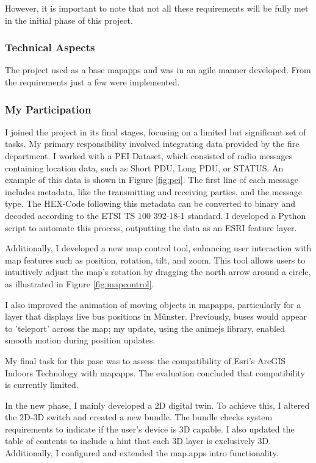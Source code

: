 \documentclass[11pt, titlepage, a4paper]{article}
\begin{document}
However, it is important to note that not all these requirements will be fully met in the initial phase of this project.


\subsubsection{Technical Aspects}
The project used as a base mapapps and was in an agile manner developed. From the requirements just a few were implemented.

\subsubsection{My Participation}
I joined the project in its final stages, focusing on a limited but significant set of tasks. My primary responsibility involved integrating data provided by the fire department. I worked with a PEI Dataset, which consisted of radio messages containing location data, such as Short PDU, Long PDU, or STATUS. An example of this data is shown in Figure \ref{fig:pei}. The first line of each message includes metadata, like the transmitting and receiving parties, and the message type. The HEX-Code following this metadata can be converted to binary and decoded according to the ETSI TS 100 392-18-1 standard. I developed a Python script to automate this process, outputting the data as an ESRI feature layer.

Additionally, I developed a new map control tool, enhancing user interaction with map features such as position, rotation, tilt, and zoom. This tool allows users to intuitively adjust the map's rotation by dragging the north arrow around a circle, as illustrated in Figure \ref{fig:mapcontrol}.


I also improved the animation of moving objects in mapapps, particularly for a layer that displays live bus positions in Münster. Previously, buses would appear to 'teleport' across the map; my update, using the animejs library, enabled smooth motion during position updates.

My final task for this pase was to assess the compatibility of Esri's ArcGIS Indoors Technology with mapapps. The evaluation concluded that compatibility is currently limited.

In the new phase, I mainly developed a 2D digital twin. To achieve this, I altered the 2D-3D switch and created a new bundle. The bundle checks system requirements to indicate if the user's device is 3D capable. I also updated the table of contents to include a hint that each 3D layer is exclusively 3D. 
Additionally, I configured and extended the map.apps intro functionality.
\end{document}
